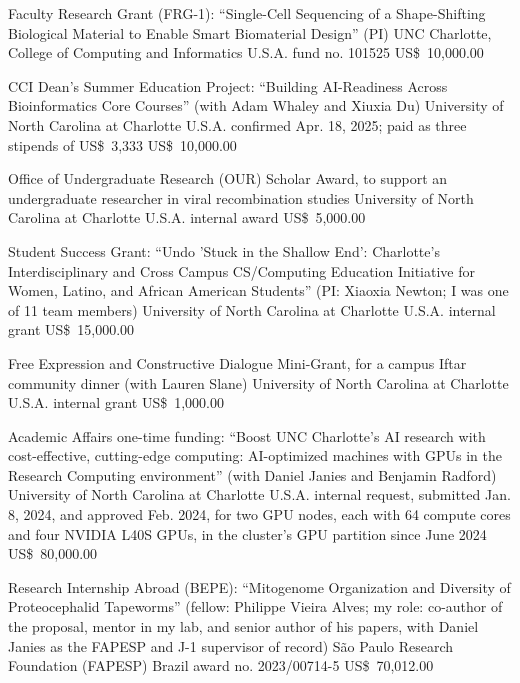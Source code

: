 \documentclass[11pt, letterpaper, sans]{moderncv}
\begin{document}
    {Faculty Research Grant (FRG-1): ``Single-Cell Sequencing of a Shape-Shifting Biological Material to Enable Smart Biomaterial Design'' (PI)}
    {UNC Charlotte, College of Computing and Informatics}
    {U.S.A.}
    {fund no. 101525}
    {US\$~10,000.00}{}

    {CCI Dean's Summer Education Project: ``Building AI-Readiness Across Bioinformatics Core Courses'' (with Adam Whaley and Xiuxia Du)}
    {University of North Carolina at Charlotte}
    {U.S.A.}
    {confirmed Apr. 18, 2025; paid as three stipends of US\$~3,333}
    {US\$~10,000.00}{}

    {Office of Undergraduate Research (OUR) Scholar Award, to support an undergraduate researcher in viral recombination studies}
    {University of North Carolina at Charlotte}
    {U.S.A.}
    {internal award}
    {US\$~5,000.00}{}

    {Student Success Grant: ``Undo 'Stuck in the Shallow End': Charlotte’s Interdisciplinary and Cross Campus CS/Computing Education Initiative for Women, Latino, and African American Students'' (PI: Xiaoxia Newton; I was one of 11 team members)}
    {University of North Carolina at Charlotte}
    {U.S.A.}
    {internal grant}
    {US\$~15,000.00}{}

    {Free Expression and Constructive Dialogue Mini-Grant, for a campus Iftar community dinner (with Lauren Slane)}
    {University of North Carolina at Charlotte}
    {U.S.A.}
    {internal grant}
    {US\$~1,000.00}{}

    {Academic Affairs one-time funding: ``Boost UNC Charlotte's AI research with cost-effective, cutting-edge computing: AI-optimized machines with GPUs in the Research Computing environment'' (with Daniel Janies and Benjamin Radford)}
    {University of North Carolina at Charlotte}
    {U.S.A.}
    {internal request, submitted Jan. 8, 2024, and approved Feb. 2024, for two GPU nodes, each with 64 compute cores and four NVIDIA L40S GPUs, in the cluster's GPU partition since June 2024}
    {US\$~80,000.00}{}

    {Research Internship Abroad (BEPE): ``Mitogenome Organization and Diversity of Proteocephalid Tapeworms'' (fellow: Philippe Vieira Alves; my role: co-author of the proposal, mentor in my lab, and senior author of his papers, with Daniel Janies as the FAPESP and J-1 supervisor of record)}
    {São Paulo Research Foundation (FAPESP)}
    {Brazil}
    {award no. 2023/00714-5}
    {US\$~70,012.00}{}
\end{document}

